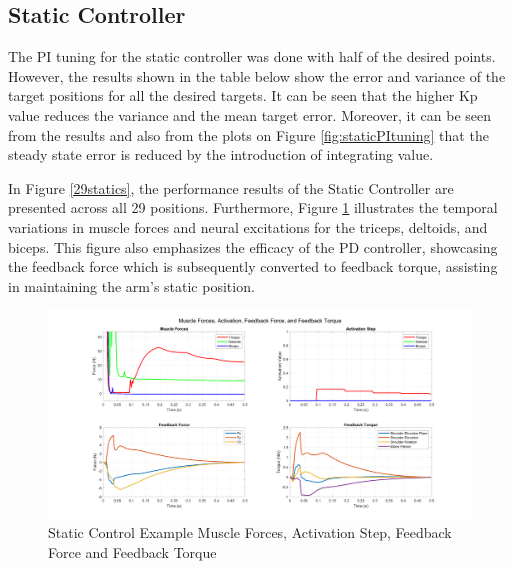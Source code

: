\newpage
\subsection{Static Controller} \label{resultsstaticcontrol}
The PI tuning for the static controller was done with half of the desired points. However, the results shown in the table below show the error and variance of the target positions for all the desired targets. It can be seen that the higher Kp value reduces the variance and the mean target error. Moreover, it can be seen from the results and also from the plots on Figure \ref{fig:staticPItuning} that the steady state error is reduced by the introduction of integrating value. 

In Figure \ref{29statics}, the performance results of the Static Controller are presented across all 29 positions. Furthermore, Figure \ref{fig:SC} illustrates the temporal variations in muscle forces and neural excitations for the triceps, deltoids, and biceps. This figure also emphasizes the efficacy of the PD controller, showcasing the feedback force which is subsequently converted to feedback torque, assisting in maintaining the arm's static position.

\begin{figure}[h!]
\centering
\includegraphics[width=1\textwidth]{Pictures/Controller/StaticControl.png} 
\caption{Static Control Example Muscle Forces, Activation Step, Feedback Force and Feedback Torque } %
\label{fig:SC} %
\end{figure}

